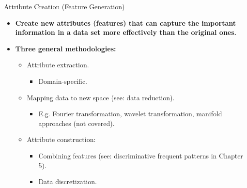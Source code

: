 \begin{frame}{Attribute Creation (Feature Generation)}
	\begin{itemize}
		\item \textbf{Create new attributes (features) that can capture the
			      important information in a data set more effectively than the original
			      ones.}
		\item \textbf{Three general methodologies:}
		      \begin{itemize}
			      \item Attribute extraction.
			            \begin{itemize}
				            \item Domain-specific.
			            \end{itemize}
			      \item Mapping data to new space (see: data reduction).
			            \begin{itemize}
				            \item E.g. Fourier transformation, wavelet transformation,
				                  manifold approaches (not covered).
			            \end{itemize}
			      \item Attribute construction:
			            \begin{itemize}
				            \item Combining features (see: discriminative frequent patterns
				                  in Chapter 5).
				            \item Data discretization.
			            \end{itemize}
		      \end{itemize}
	\end{itemize}
\end{frame}

